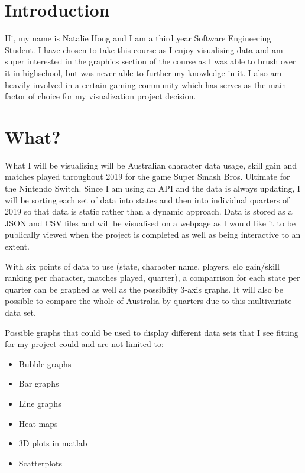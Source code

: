 \documentclass[11pt, oneside, a4paper]{article}
\begin{document}
\section*{Introduction}
Hi, my name is Natalie Hong and I am a third year Software Engineering Student. I have chosen to take this course as I enjoy visualising data and am super interested in the graphics section of the course as I was able to brush over it in highschool, but was never able to further my knowledge in it.
I also am heavily involved in a certain gaming community which has serves as the main factor of choice for my visualization project decision.

\section*{What?}
What I will be visualising will be Australian character data usage, skill gain and matches played throughout 2019 for the game Super Smash Bros. Ultimate for the Nintendo Switch. 
Since I am using an API and the data is always updating, I will be sorting each set of data into states and then into individual quarters of 2019 so that data is static rather than a dynamic approach.
Data is stored as a JSON and CSV files and will be visualised on a webpage as I would like it to be publically viewed when the project is completed as well as being interactive to an extent.

With six points of data to use (state, character name, players, elo gain/skill ranking per character, matches played, quarter), a comparrison for each state per quarter can be graphed as well as the possiblity 3-axis graphs. It will also be possible to compare the whole of Australia by quarters due to this multivariate data set.

Possible graphs that could be used to display different data sets that I see fitting for my project could and are not limited to:
\begin{itemize}
    \item Bubble graphs
    \item Bar graphs
    \item Line graphs
    \item Heat maps
    \item 3D plots in matlab
    \item Scatterplots
\end{itemize}
\end{document}
